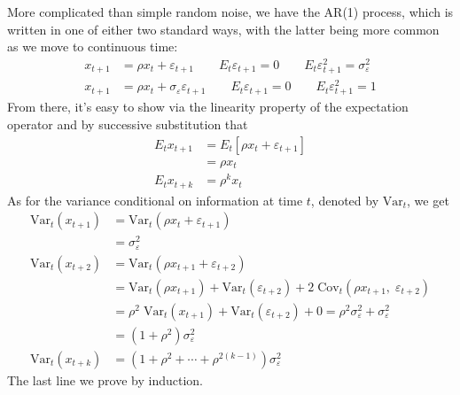 \documentclass[a4paper,12pt]{scrartcl}
\begin{document}
More complicated than simple random noise, we have the AR(1) process,
which is written in one of either two standard ways, with the latter
being more common as we move to continuous time:
\begin{align*}
    x_{t+1} &= \rho x_t + \varepsilon_{t+1} \qquad 
	E_t\varepsilon_{t+1} = 0 \qquad
	E_t\varepsilon^2_{t+1} = \sigma^2_\varepsilon \\
    x_{t+1} &= \rho x_t + \sigma_\varepsilon \varepsilon_{t+1} \qquad 
	E_t\varepsilon_{t+1} = 0 \qquad
	E_t\varepsilon^2_{t+1} = 1 
\end{align*}
From there, it's easy to show via the linearity property of the 
expectation operator and by successive substitution that
\begin{align*}
    E_t x_{t+1} &= E_t[\rho x_t + \varepsilon_{t+1}] \\
    &= \rho x_t \\
    E_t x_{t+k} &= \rho^k x_t
\end{align*}
As for the variance conditional on information at time $t$, denoted
by $\text{Var}_t$, we get
\begin{align*}
    \text{Var}_t(x_{t+1}) &= \text{Var}_t(\rho x_t + \varepsilon_{t+1}) \\
	&= \sigma_\varepsilon^2 \\
    \text{Var}_t(x_{t+2}) &= \text{Var}_t(\rho x_{t+1} + \varepsilon_{t+2}) \\
	&= \text{Var}_t(\rho x_{t+1}) + \text{Var}_t(\varepsilon_{t+2}) 
	    + 2 \; \text{Cov}_t(\rho x_{t+1}, \; \varepsilon_{t+2}) \\
	&= \rho^2 \; \text{Var}_t(x_{t+1}) + \text{Var}_t(\varepsilon_{t+2}) 
	    + 0 
	= \rho^2 \sigma_\varepsilon^2 + \sigma_\varepsilon^2 \\
	&= (1+\rho^2) \sigma_\varepsilon^2 \\
    \text{Var}_t(x_{t+k}) &= (1 + \rho^2 + \cdots + \rho^{2(k-1)}) 
	\sigma^2_\varepsilon
\end{align*}
The last line we prove by induction.
\end{document}
